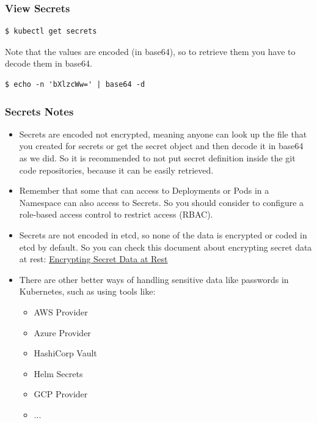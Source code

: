 \documentclass{article}
\newenvironment{blocktemplateIII}[1]{%
    \tcolorbox[beamer,%
    noparskip,breakable,
    ,colframe=Red,%
    colbacklower=LimeGreen!75!LightGreen,%
    title=#1]}%
    {\endtcolorbox}
\newenvironment{codetemplate}[1][]{%
  \mybasecolorbox[#1]
  \itshape
}{%
  \endmybasecolorbox
}
\begin{document}
\subsubsection{View Secrets}
\begin{codetemplate}{}
\begin{verbatim}
$ kubectl get secrets
\end{verbatim}
\end{codetemplate}
\begin{blocktemplateIII}{WARNING}
Note that the values are encoded (in base64), so to retrieve them you have to decode them in base64.
\begin{codetemplate}{}
\begin{verbatim}
$ echo -n 'bXlzcWw=' | base64 -d
\end{verbatim}
\end{codetemplate}
\end{blocktemplateIII}

\subsubsection{Secrets Notes}
\begin{itemize}
    \item Secrets are encoded not encrypted, meaning anyone can look up the file that you created for secrets or get the secret object and then decode it in base64 as we did. So it is recommended to not put secret definition inside the git code repositories, because it can be easily retrieved.
    \item Remember that some that can access to Deployments or Pods in a Namespace can also access to Secrets. So you should consider to configure a role-based access control to restrict access (RBAC).
    \item Secrets are not encoded in etcd, so none of the data is encrypted or coded in etcd by default. So you can check this document about encrypting secret data at rest: \href{https://pwittrock.github.io/docs/tasks/administer-cluster/encrypt-data/}{Encrypting Secret Data at Rest}
    \item There are other better ways of handling sensitive data like passwords in Kubernetes, such as using tools like:
    \begin{itemize}
        \item AWS Provider
        \item Azure Provider
        \item HashiCorp Vault
        \item Helm Secrets
        \item GCP Provider
        \item ...
    \end{itemize}
\end{itemize}
\end{document}
